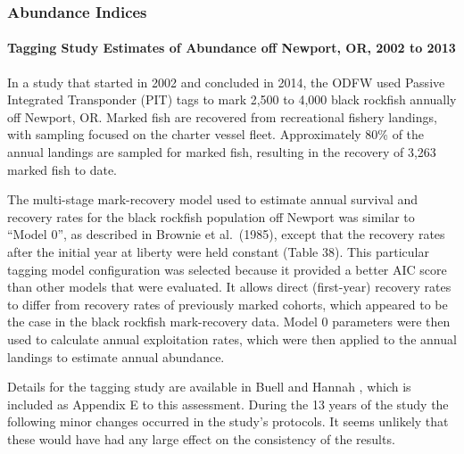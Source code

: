 \documentclass[11pt,
  english,
  letterpaper,
]{article}
\begin{document}
\hypertarget{abundance-indices}{%
\subsubsection{Abundance Indices}\label{abundance-indices}}

\hypertarget{tagging-study-estimates-of-abundance-off-newport-or-2002-to-2013}{%
\paragraph{Tagging Study Estimates of Abundance off Newport, OR, 2002 to 2013}\label{tagging-study-estimates-of-abundance-off-newport-or-2002-to-2013}}

In a study that started in 2002 and concluded in 2014, the ODFW used Passive Integrated Transponder (PIT) tags to mark 2,500 to 4,000 black rockfish annually off Newport, OR. Marked fish are recovered from recreational fishery landings, with sampling focused on the charter vessel fleet. Approximately 80\% of the annual landings are sampled for marked fish, resulting in the recovery of 3,263 marked fish to date.

The multi-stage mark-recovery model used to estimate annual survival and recovery rates for the black rockfish population off Newport was similar to ``Model 0'', as described in Brownie et al.~(1985), except that the recovery rates after the initial year at liberty were held constant (Table 38). This particular tagging model configuration was selected because it provided a better AIC score than other models that were evaluated. It allows direct (first-year) recovery rates to differ from recovery rates of previously marked cohorts, which appeared to be the case in the black rockfish mark-recovery data. Model 0 parameters were then used to calculate annual exploitation rates, which were then applied to the annual landings to estimate annual abundance.

Details for the tagging study are available in Buell and Hannah , which is included as Appendix E to this assessment. During the 13 years of the study the following minor changes occurred in the study's protocols. It seems unlikely that these would have had any large effect on the consistency of the results.
\end{document}
